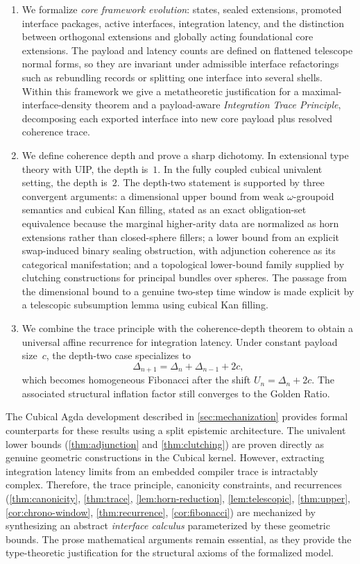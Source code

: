 \documentclass{lmcs}
\begin{document}
\begin{enumerate}
    \item We formalize \emph{core framework evolution}: states, sealed extensions, promoted interface packages, active interfaces, integration latency, and the distinction between orthogonal extensions and globally acting foundational core extensions. The payload and latency counts are defined on flattened telescope normal forms, so they are invariant under admissible interface refactorings such as rebundling records or splitting one interface into several shells. Within this framework we give a metatheoretic justification for a maximal-interface-density theorem and a payload-aware \emph{Integration Trace Principle}, decomposing each exported interface into new core payload plus resolved coherence trace.
    \item We define coherence depth and prove a sharp dichotomy. In extensional type theory with UIP, the depth is~$1$. In the fully coupled cubical univalent setting, the depth is~$2$. The depth-two statement is supported by three convergent arguments: a dimensional upper bound from weak $\omega$-groupoid semantics and cubical Kan filling, stated as an exact obligation-set equivalence because the marginal higher-arity data are normalized as horn extensions rather than closed-sphere fillers; a lower bound from an explicit swap-induced binary sealing obstruction, with adjunction coherence as its categorical manifestation; and a topological lower-bound family supplied by clutching constructions for principal bundles over spheres. The passage from the dimensional bound to a genuine two-step time window is made explicit by a telescopic subsumption lemma using cubical Kan filling.
    \item We combine the trace principle with the coherence-depth theorem to obtain a universal affine recurrence for integration latency. Under constant payload size~$c$, the depth-two case specializes to
    \[
      \Delta_{n+1} = \Delta_n + \Delta_{n-1} + 2c,
    \]
    which becomes homogeneous Fibonacci after the shift $U_n=\Delta_n+2c$. The associated structural inflation factor still converges to the Golden Ratio.
\end{enumerate}

The Cubical Agda development described in \autoref{sec:mechanization} provides formal counterparts for these results using a split epistemic architecture. The univalent lower bounds (\autoref{thm:adjunction} and \autoref{thm:clutching}) are proven directly as genuine geometric constructions in the Cubical kernel. However, extracting integration latency limits from an embedded compiler trace is intractably complex. Therefore, the trace principle, canonicity constraints, and recurrences (\autoref{thm:canonicity}, \autoref{thm:trace}, \autoref{lem:horn-reduction}, \autoref{lem:telescopic}, \autoref{thm:upper}, \autoref{cor:chrono-window}, \autoref{thm:recurrence}, \autoref{cor:fibonacci}) are mechanized by synthesizing an abstract \emph{interface calculus} parameterized by these geometric bounds. The prose mathematical arguments remain essential, as they provide the type-theoretic justification for the structural axioms of the formalized model.
\end{document}
